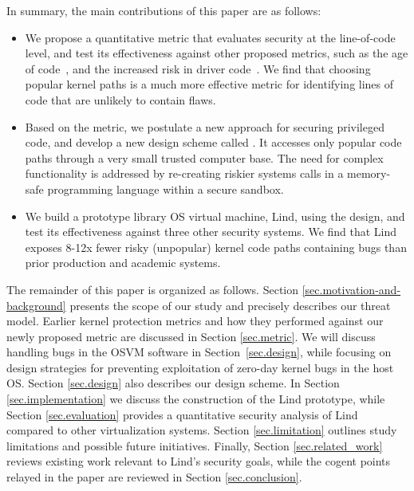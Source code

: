 In summary, the main contributions of this paper are as follows:

\begin{itemize}\setlength\itemsep{0em}

\item
We propose a quantitative metric that evaluates security at the line-of-code
level, and test its effectiveness against other proposed metrics,
such as the age of code~\cite{ozment2006milk}, and
the increased risk in driver code~\cite{PittSFIeld}.  We find that 
choosing popular kernel paths is a much more effective metric for identifying lines of
code that are unlikely to contain flaws.

\item
Based on the metric, we postulate a new approach for securing privileged code,
and develop a new design scheme called \lip. It
accesses only popular code paths
through a very small trusted computer base.
The need for complex functionality is addressed by re-creating riskier systems calls
in a memory-safe programming language within a secure sandbox.

\item
We build a prototype library OS virtual machine, Lind, using the \lip design, 
and test its effectiveness against three other security systems. We find that
Lind exposes 8-12x fewer risky (unpopular) kernel code paths containing bugs 
than prior production and academic systems.
\end{itemize}

The remainder of this paper is organized as follows.
Section \ref{sec.motivation-and-background} presents the scope of our study
and precisely describes our threat model.
Earlier kernel protection metrics and how they performed
against our newly proposed metric are discussed in Section \ref{sec.metric}.
We will discuss handling bugs in the OSVM software in
Section~\ref{sec.design}, while focusing on design strategies for preventing exploitation of zero-day kernel
bugs in the host OS.
Section \ref{sec.design} also describes our \lip design scheme.
In Section \ref{sec.implementation} we discuss the construction of the Lind
prototype, while Section \ref{sec.evaluation} provides a quantitative
security analysis of Lind compared to other virtualization systems.
Section \ref{sec.limitation} outlines study limitations and possible future initiatives.
Finally, Section \ref{sec.related_work} reviews existing work relevant to Lind's security goals,
while the cogent points relayed in the paper are reviewed in Section \ref{sec.conclusion}.
